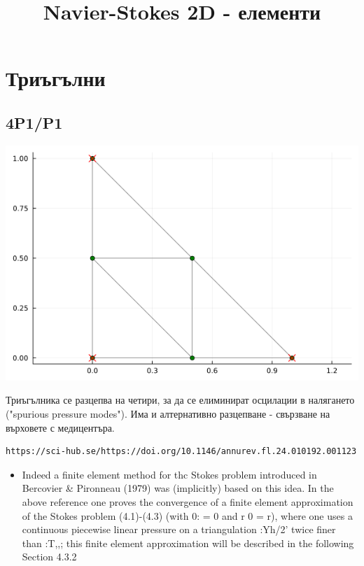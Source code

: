 \documentclass[fleqn,12pt]{article}
\title{Navier-Stokes 2D - елементи}
\begin{document}
    
\maketitle

\tableofcontents
\pagebreak

\section{Триъгълни}

\subsection{4P1/P1}
\includegraphics[width=140mm]{img/4p1p1.png}

Триъгълника се разцепва на четири, за да се елиминират осцилации в налягането ("spurious pressure modes").
Има и алтернативно разцепване - свързване на върховете с медицентъра.

\begin{verbatim}
https://sci-hub.se/https://doi.org/10.1146/annurev.fl.24.010192.001123
\end{verbatim}
\begin{itemize}
    \item Indeed a finite element method for thc Stokes problem
    introduced in Bercovier \& Pironneau (1979) was (implicitly) based on this
    idea. In the above reference one proves the convergence of a finite element
    approximation of the Stokes problem (4.1)-(4.3) (with 0: = 0 and r 0 = r),
    where one uses a continuous piecewise linear pressure on a triangulation
    :Yh/2' twice finer than :T,,; this finite element approximation will be described
    in the following Section 4.3.2
\end{itemize}
\end{document}
